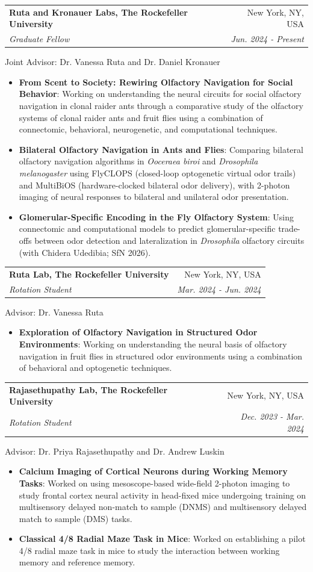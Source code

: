 \documentclass[letterpaper,9pt]{article}
\makeatletter
\newcommand{\resumeItem}[2]{
  \item\small{
    \textbf{#1}{: #2 \vspace{-2pt}}
  }
}
\newcommand{\resumeSubheadingWithText}[5]{
  \vspace{-1pt}\item
    \begin{tabular*}{0.97\textwidth}[t]{l@{\extracolsep{\fill}}r}
      \textbf{#1} & #2 \\
      \textit{\small#3} & \textit{\small #4}
    \end{tabular*}\vspace{2pt}
}
\newcommand{\resumeItemListStart}{\begin{itemize}}
\newcommand{\resumeItemListEnd}{\end{itemize}\vspace{-5pt}}
\makeatother
\begin{document}
    \resumeSubheadingWithText
    {Ruta and Kronauer Labs, The Rockefeller University}{New York, NY, USA}
    {Graduate Fellow}{Jun. 2024 - Present}
    \small{Joint Advisor: Dr. Vanessa Ruta and Dr. Daniel Kronauer}
    \resumeItemListStart
      \resumeItem{From Scent to Society: Rewiring Olfactory Navigation for Social Behavior}
        {Working on understanding the neural circuits for social olfactory navigation in clonal raider ants through a comparative study of the olfactory systems of clonal raider ants and fruit flies using a combination of connectomic, behavioral, neurogenetic, and computational techniques.}
      \resumeItem{Bilateral Olfactory Navigation in Ants and Flies}
        {Comparing bilateral olfactory navigation algorithms in \textit{Ooceraea biroi} and \textit{Drosophila melanogaster} using FlyCLOPS (closed-loop optogenetic virtual odor trails) and MultiBiOS (hardware-clocked bilateral odor delivery), with 2-photon imaging of neural responses to bilateral and unilateral odor presentation.}
      \resumeItem{Glomerular-Specific Encoding in the Fly Olfactory System}
        {Using connectomic and computational models to predict glomerular-specific trade-offs between odor detection and lateralization in \textit{Drosophila} olfactory circuits (with Chidera Udedibia; SfN 2026).}
    \resumeItemListEnd


    \resumeSubheadingWithText
      {Ruta Lab, The Rockefeller University}{New York, NY, USA}
      {Rotation Student}{Mar. 2024 - Jun. 2024}
      \small{Advisor: Dr. Vanessa Ruta}
      \resumeItemListStart
        \resumeItem{Exploration of Olfactory Navigation in Structured Odor Environments}
          {Working on understanding the neural basis of olfactory navigation in fruit flies in structured odor environments using a combination of behavioral and optogenetic techniques.}
      \resumeItemListEnd

    \resumeSubheadingWithText
      {Rajasethupathy Lab, The Rockefeller University}{New York, NY, USA}
      {Rotation Student}{Dec. 2023 - Mar. 2024}
      \small{Advisor: Dr. Priya Rajasethupathy and Dr. Andrew Luskin}
      \resumeItemListStart
        \resumeItem{Calcium Imaging of Cortical Neurons during Working Memory Tasks}
          {Worked on using mesoscope-based wide-field 2-photon imaging to study frontal cortex neural activity in head-fixed mice undergoing training on multisensory delayed non-match to sample (DNMS) and multisensory delayed match to sample (DMS) tasks.}
        \resumeItem{Classical 4/8 Radial Maze Task in Mice}
          {Worked on establishing a pilot 4/8 radial maze task in mice to study the interaction between working memory and reference memory.}
      \resumeItemListEnd
      
\end{document}

